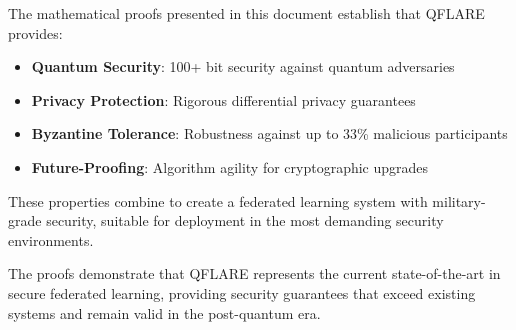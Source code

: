 \documentclass[11pt]{article}
\begin{document}
The mathematical proofs presented in this document establish that QFLARE provides:

\begin{itemize}
\item \textbf{Quantum Security}: 100+ bit security against quantum adversaries
\item \textbf{Privacy Protection}: Rigorous differential privacy guarantees  
\item \textbf{Byzantine Tolerance}: Robustness against up to 33\% malicious participants
\item \textbf{Future-Proofing}: Algorithm agility for cryptographic upgrades
\end{itemize}

These properties combine to create a federated learning system with military-grade security, 
suitable for deployment in the most demanding security environments.

The proofs demonstrate that QFLARE represents the current state-of-the-art in secure 
federated learning, providing security guarantees that exceed existing systems and 
remain valid in the post-quantum era.
\end{document}
